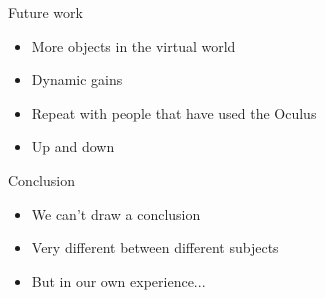 \begin{frame}{Future work}
	\begin{itemize}
		\item More objects in the virtual world 
		\item Dynamic gains 
		\item Repeat with people that have used the Oculus 
		\item Up and down 
	\end{itemize}
\end{frame}

\begin{frame}{Conclusion}
	\begin{itemize}
		\item We can't draw a conclusion
		\item Very different between different subjects
		\item But in our own experience...
	\end{itemize}
\end{frame}

\begin{frame}
\end{frame}
